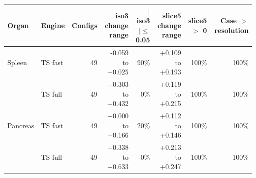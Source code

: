\begin{tabular}{llrrrrrr}
\toprule
Organ & Engine & Configs & iso3 change range & $|$iso3$|\leq$0.05 & slice5 change range & slice5 $>$ 0 & Case $>$ resolution \\
\midrule
Spleen & TS fast & 49 & -0.059 to +0.025 & 90\% & +0.109 to +0.193 & 100\% & 100\% \\
 & TS full & 49 & +0.303 to +0.432 & 0\% & +0.119 to +0.215 & 100\% & 100\% \\
Pancreas & TS fast & 49 & +0.000 to +0.166 & 20\% & +0.112 to +0.146 & 100\% & 100\% \\
 & TS full & 49 & +0.338 to +0.633 & 0\% & +0.213 to +0.247 & 100\% & 100\% \\
\bottomrule
\end{tabular}
